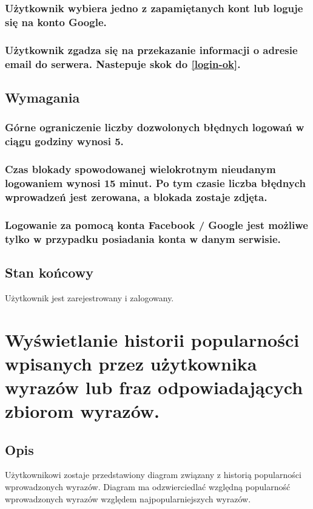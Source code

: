 \documentclass[a4paper]{article}
\begin{document}
\subsubsection{Użytkownik wybiera jedno z zapamiętanych kont lub loguje się na konto Google.}

\subsubsection{Użytkownik zgadza się na przekazanie informacji o adresie email do serwera. Nastepuje skok do \ref{login-ok}. \label{login-google-zgoda}}


\subsection{Wymagania}

\subsubsection{Górne ograniczenie liczby dozwolonych błędnych logowań w ciągu godziny wynosi 5. \label{limit-logowan} }

\subsubsection{Czas blokady spowodowanej wielokrotnym nieudanym logowaniem wynosi 15 minut. Po tym czasie liczba błędnych wprowadzeń jest zerowana, a blokada zostaje zdjęta. \label{login-czas-blokady}}

\subsubsection{Logowanie za pomocą konta Facebook / Google jest możliwe tylko w przypadku posiadania konta w danym serwisie.}

\subsection*{Stan końcowy}
Użytkownik jest zarejestrowany i zalogowany.


\newpage


\section{Wyświetlanie historii popularności wpisanych przez użytkownika wyrazów lub fraz
odpowiadających zbiorom wyrazów.}

\subsection*{Opis}
Użytkownikowi zostaje przedstawiony diagram związany z historią popularności wprowadzonych wyrazów. Diagram ma odzwierciedlać względną popularność wprowadzonych wyrazów względem najpopularniejszych wyrazów.
\end{document}
